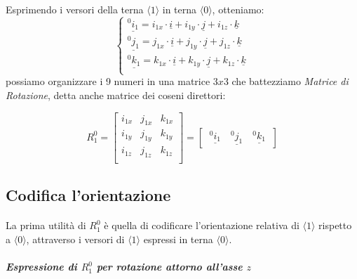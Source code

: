 \paragraph{}
Esprimendo i versori della terna $\langle1\rangle$ in terna $\langle0\rangle$, otteniamo:\\
\begin{equation}
	\begin{cases}
		\underline{^0i_{1}}=i_{1x}\cdot\underline{i} + i_{1y}\cdot\underline{j} + i_{1z}\cdot\underline{k}\\
		\underline{^0j_{1}}=j_{1x}\cdot\underline{i} + j_{1y}\cdot\underline{j} + j_{1z}\cdot\underline{k}\\
		\underline{^0k_{1}}=k_{1x}\cdot\underline{i} + k_{1y}\cdot\underline{j} + k_{1z}\cdot\underline{k}\\
	\end{cases}
\end{equation}
possiamo organizzare i 9 numeri in una matrice $3x3$ che battezziamo \emph{Matrice di Rotazione}, detta anche matrice dei coseni direttori:

\begin{equation}
	R_{1}^{0} = 
	\begin{bmatrix}
		i_{1x} & j_{1x} & k_{1x} \\
		i_{1y} & j_{1y} & k_{1y} \\
		i_{1z} & j_{1z} & k_{1z} \\
	\end{bmatrix}
	= 
	\begin{bmatrix}
		\:\underline{^0i_{1}} \quad \underline{^0j_{1}} \quad\underline{^0k_{1}}\:
	\end{bmatrix}
\end{equation}

\subsection{Codifica l'orientazione}
\paragraph{}
La prima utilità di $R_{1}^{0}$ è quella di codificare l'orientazione relativa di $\langle1\rangle$ rispetto a $\langle0\rangle$, attraverso i versori di $\langle1\rangle$ espressi in terna $\langle0\rangle$.

\subparagraph{Espressione di $R_{1}^{0}$ per rotazione attorno all'asse $z$}
